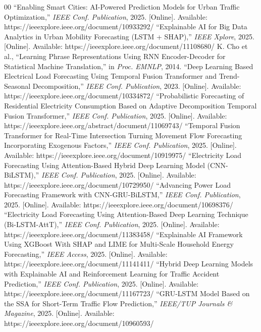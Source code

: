 \documentclass[conference]{IEEEtran}
\begin{document}
\begin{thebibliography}{00}
\small
{} ``Enabling Smart Cities: AI-Powered Prediction Models for Urban Traffic Optimization,'' \textit{IEEE Conf. Publication}, 2025. [Online]. Available: https://ieeexplore.ieee.org/document/10933292/
 ``Explainable AI for Big Data Analytics in Urban Mobility Forecasting (LSTM + SHAP),'' \textit{IEEE Xplore}, 2025. [Online]. Available: https://ieeexplore.ieee.org/document/11108680/
 K. Cho et al., ``Learning Phrase Representations Using RNN Encoder-Decoder for Statistical Machine Translation,'' in \textit{Proc. EMNLP}, 2014.
 ``Deep Learning Based Electrical Load Forecasting Using Temporal Fusion Transformer and Trend-Seasonal Decomposition,'' \textit{IEEE Conf. Publication}, 2023. [Online]. Available: https://ieeexplore.ieee.org/document/10334872/
 ``Probabilistic Forecasting of Residential Electricity Consumption Based on Adaptive Decomposition Temporal Fusion Transformer,'' \textit{IEEE Conf. Publication}, 2025. [Online]. Available: https://ieeexplore.ieee.org/abstract/document/11069743/
 ``Temporal Fusion Transformer for Real-Time Intersection Turning Movement Flow Forecasting Incorporating Exogenous Factors,'' \textit{IEEE Conf. Publication}, 2025. [Online]. Available: https://ieeexplore.ieee.org/document/10919975/
 ``Electricity Load Forecasting Using Attention-Based Hybrid Deep Learning Model (CNN-BiLSTM),'' \textit{IEEE Conf. Publication}, 2025. [Online]. Available: https://ieeexplore.ieee.org/document/10729950/
 ``Advancing Power Load Forecasting Framework with CNN-GRU-BiLSTM,'' \textit{IEEE Conf. Publication}, 2025. [Online]. Available: https://ieeexplore.ieee.org/document/10698376/
 ``Electricity Load Forecasting Using Attention-Based Deep Learning Technique (Bi-LSTM-AttT),'' \textit{IEEE Conf. Publication}, 2025. [Online]. Available: https://ieeexplore.ieee.org/document/11383458/
 ``Explainable AI Framework Using XGBoost With SHAP and LIME for Multi-Scale Household Energy Forecasting,'' \textit{IEEE Access}, 2025. [Online]. Available: https://ieeexplore.ieee.org/document/11141411/
 ``Hybrid Deep Learning Models with Explainable AI and Reinforcement Learning for Traffic Accident Prediction,'' \textit{IEEE Conf. Publication}, 2025. [Online]. Available: https://ieeexplore.ieee.org/document/11167723/
 ``GRU-LSTM Model Based on the SSA for Short-Term Traffic Flow Prediction,'' \textit{IEEE/TUP Journals \& Magazine}, 2025. [Online]. Available: https://ieeexplore.ieee.org/document/10960593/

\end{thebibliography}
\end{document}
